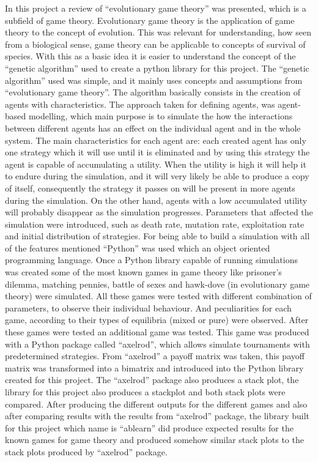In this project a review of  ``evolutionary game theory'' was presented, which is a subfield of game theory. Evolutionary game theory is the application of game theory to the concept of evolution. This was relevant for understanding, how seen from a biological sense, game theory can be applicable to concepts of survival of species. With this as a basic idea it is easier to understand the concept of the ``genetic algorithm'' used to create a python library for this project. The ``genetic algorithm'' used was simple, and it mainly uses concepts and assumptions from ``evolutionary game theory''. The algorithm basically consists in the creation of agents with characteristics. The approach taken for defining agents, was agent-based modelling, which main purpose is to simulate the how the interactions between different agents has an effect on the individual agent and in the whole system. The main characteristics for each agent are: each created agent has only one strategy which it will use until it is eliminated and by using this strategy the agent is capable of accumulating a utility. When the utility is high it will help it to endure during the simulation, and it will very likely be able to produce a copy of itself, consequently the strategy it passes on will be present in more agents during the simulation. On the other hand, agents with a low accumulated utility will probably disappear as the simulation progresses. Parameters that affected  the simulation were introduced, such as death rate, mutation rate, exploitation rate and initial distribution of strategies. For being able to build a simulation with all of the features mentioned ``Python'' was used which an object oriented programming language. Once a Python library capable of running simulations was created some of the most known games in game theory like prisoner's dilemma, matching pennies, battle of sexes and hawk-dove (in evolutionary game theory) were simulated. All these games were tested with different combination of parameters, to observe their individual behaviour. And peculiarities for each game, according to their types of equilibria (mixed or pure) were observed. After these games were tested an additional game was tested. This game was produced with a Python package called ``axelrod'', which allows simulate tournaments with predetermined strategies. From ``axelrod'' a payoff matrix was taken, this payoff matrix was transformed into a bimatrix and introduced into the Python library created for this project. The ``axelrod'' package also produces a stack plot, the library for this project also produces a stackplot and both stack plots were compared. After producing the different outputs for the different games and also after comparing results with the results from ``axelrod'' package, the library built for this project which name is ``ablearn'' did produce expected results for the known games for game theory and produced somehow similar stack plots to the stack plots produced by ``axelrod'' package.